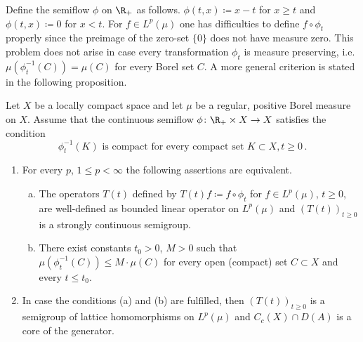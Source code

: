 Define the semiflow $\phi$ on $\R _+$ as follows. 
$\phi(t,x) \coloneqq  x-t$ for $x \geq t$ and $\phi(t,x) \coloneqq  0$ for $x < t$. 
For $f \in L^p(\mu)$ one has difficulties to define $f \circ \phi_t$ properly since the preimage of the zero-set $\{0\}$ does
not have measure zero. This problem does not arise in case every
transformation $\phi_t$ is measure preserving, i.e. $\mu(\phi_t^{-1}(C)) = \mu(C)$
for every Borel set $C$. A more general criterion is stated in the
following proposition.

\begin{proposition}\label{prop:c3-4.11}
Let $X$ be a locally compact space and let $\mu$ be a
regular, positive Borel measure on $X$. Assume that the continuous
semiflow $\phi \colon \R _+ \times X \to X$ satisfies the condition
\begin{equation}\label{eq:c3-4.12}
	\phi_t^{-1}(K)  \text{ is compact for every compact set }  K \subset X , t \geq 0\,.
\end{equation}
\begin{enumerate}[\upshape (i)]
\item		
For every $p$, $1 \leq p < \infty$ the following assertions are equivalent.

\begin{enumerate} [(a)]
\item
The operators $T(t)$ defined by $T(t)f \coloneqq  f \circ \phi_t$ for $f \in L^p(\mu)$, $t \geq 0$, are well-defined as bounded linear operator on $L^p(\mu)$ and $(T(t))_{t \geq 0}$ is a strongly continuous semigroup.
			
\item 
There exist constants $t_0 > 0$, $M > 0$ such that $\mu(\phi_t^{-1}(C)) \leq M \cdot \mu(C)$ for every open (compact) set $C \subset X$ and every $t \leq t_0$.
\end{enumerate}
	
\item 
In case the conditions (a) and (b) are fulfilled, then $(T(t))_{t \geq 0}$ is a semigroup of lattice homomorphisms on $L^p(\mu)$ and $C_c(X) \cap D(A)$ is a core%
of the generator.
\end{enumerate}
\end{proposition}
